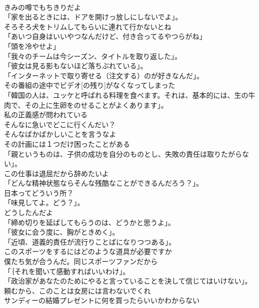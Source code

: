 \documentclass[8pt]{extreport}
\begin{document}
\begin{CJK}{UTF8}{min}
\\	きみの噂でもちきりだよ	
\\	「家を出るときには、ドアを開けっ放しにしないでよ」。	
\\	そろそろ犬をトリムしてもらいに連れて行かないとね	
\\	「あいつ自身はいいやつなんだけど、付き合ってるやつらがね」	
\\	「頭を冷やせよ」	
\\	「我々のチームは今シーズン、タイトルを取り返した」。	
\\	「彼女は見る影もないほど落ちぶれている」。	
\\	「インターネットで取り寄せる（注文する）のが好きなんだ」。	
\\	その番組の途中でビデオ[の残り]がなくなってしまった	
\\	「韓国の人は、ユッケと呼ばれる料理を食べます。それは、基本的には、生の牛肉で、その上に生卵をのせることがよくあります」。	
\\	私の正義感が問われている	
\\	そんなに急いでどこに行くんだい？	
\\	そんなばかばかしいことを言うなよ	
\\	その計画には１つだけ困ったことがある	
\\	「親というものは、子供の成功を自分のものとし、失敗の責任は取りたがらない」。	
\\	この仕事は退屈だから辞めたいよ	
\\	「どんな精神状態ならそんな残酷なことができるんだろう？」。	
\\	日本ってどういう所？	
\\	「味見してよ。どう？」。	
\\	どうしたんだよ	
\\	「締め切りを延ばしてもらうのは、どうかと思うよ」。	
\\	「彼女に会う度に、胸がときめく」。	
\\	「近頃、道義的責任が流行りことばになりつつある」。	
\\	このスポーツをするにはどのような道具が必要ですか	
\\	僕たち気が合うんだ。同じスポーツファンだから	
\\	「｛それを聞いて感動すればいいわけ」。	
\\	「政治家があなたのためにやると言っていることを決して信じてはいけない」。	
\\	頼むから、このことは女房には言わないでくれ	
\\	サンディーの結婚プレゼントに何を買ったらいいかわからない	

\end{CJK}
\end{document}
